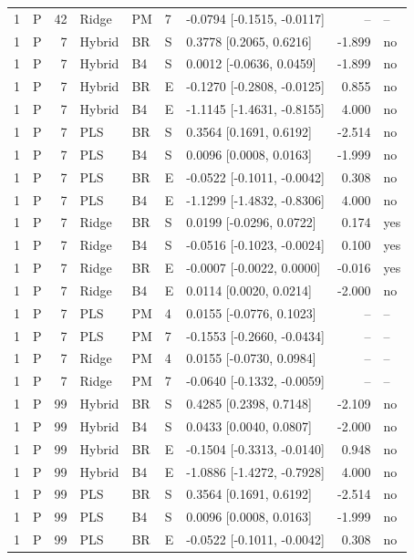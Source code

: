 \documentclass[10pt,a4paper]{article}
\begin{document}
\begin{landscape}
\begin{longtable}{rlrllllrl}
1 & P & 42 & Ridge & PM & 7 & -0.0794 [-0.1515, -0.0117] & -- & -- \\
1 & P & 7 & Hybrid & BR & S & 0.3778 [0.2065, 0.6216] & -1.899 & no \\
1 & P & 7 & Hybrid & B4 & S & 0.0012 [-0.0636, 0.0459] & -1.899 & no \\
1 & P & 7 & Hybrid & BR & E & -0.1270 [-0.2808, -0.0125] & 0.855 & no \\
1 & P & 7 & Hybrid & B4 & E & -1.1145 [-1.4631, -0.8155] & 4.000 & no \\
1 & P & 7 & PLS & BR & S & 0.3564 [0.1691, 0.6192] & -2.514 & no \\
1 & P & 7 & PLS & B4 & S & 0.0096 [0.0008, 0.0163] & -1.999 & no \\
1 & P & 7 & PLS & BR & E & -0.0522 [-0.1011, -0.0042] & 0.308 & no \\
1 & P & 7 & PLS & B4 & E & -1.1299 [-1.4832, -0.8306] & 4.000 & no \\
1 & P & 7 & Ridge & BR & S & 0.0199 [-0.0296, 0.0722] & 0.174 & yes \\
1 & P & 7 & Ridge & B4 & S & -0.0516 [-0.1023, -0.0024] & 0.100 & yes \\
1 & P & 7 & Ridge & BR & E & -0.0007 [-0.0022, 0.0000] & -0.016 & yes \\
1 & P & 7 & Ridge & B4 & E & 0.0114 [0.0020, 0.0214] & -2.000 & no \\
1 & P & 7 & PLS & PM & 4 & 0.0155 [-0.0776, 0.1023] & -- & -- \\
1 & P & 7 & PLS & PM & 7 & -0.1553 [-0.2660, -0.0434] & -- & -- \\
1 & P & 7 & Ridge & PM & 4 & 0.0155 [-0.0730, 0.0984] & -- & -- \\
1 & P & 7 & Ridge & PM & 7 & -0.0640 [-0.1332, -0.0059] & -- & -- \\
1 & P & 99 & Hybrid & BR & S & 0.4285 [0.2398, 0.7148] & -2.109 & no \\
1 & P & 99 & Hybrid & B4 & S & 0.0433 [0.0040, 0.0807] & -2.000 & no \\
1 & P & 99 & Hybrid & BR & E & -0.1504 [-0.3313, -0.0140] & 0.948 & no \\
1 & P & 99 & Hybrid & B4 & E & -1.0886 [-1.4272, -0.7928] & 4.000 & no \\
1 & P & 99 & PLS & BR & S & 0.3564 [0.1691, 0.6192] & -2.514 & no \\
1 & P & 99 & PLS & B4 & S & 0.0096 [0.0008, 0.0163] & -1.999 & no \\
1 & P & 99 & PLS & BR & E & -0.0522 [-0.1011, -0.0042] & 0.308 & no \\

\end{longtable}
\end{landscape}
\end{document}
